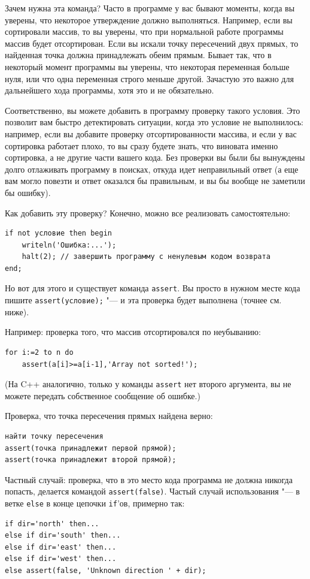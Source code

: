 \documentclass[a4paper,10pt]{problems}
\begin{document}
Зачем нужна эта команда? 
Часто в программе у вас бывают моменты, когда вы уверены, что некоторое утверждение должно выполняться.
Например, если вы сортировали массив, то вы уверены, что при нормальной работе программы массив будет отсортирован.
Если вы искали точку пересечений двух прямых, то найденная точка должна принадлежать обеим прямым. 
Бывает так, что в некоторый момент программы вы уверены, что некоторая переменная больше нуля, или
что одна переменная строго меньше другой. Зачастую это важно для дальнейшего хода программы, хотя это и не обязательно.

Соответственно, вы можете добавить в программу проверку такого условия. 
Это позволит вам быстро детектировать ситуации, когда это условие не выполнилось: например, если вы добавите проверку отсортированности массива,
и если у вас сортировка работает плохо, то вы сразу будете знать, что виновата именно сортировка, а не другие части вашего кода.
Без проверки вы были бы вынуждены долго отлаживать программу в поисках, откуда идет неправильный ответ (а еще вам могло повезти и ответ оказался бы правильным,
и вы бы вообще не заметили бы ошибку).

Как добавить эту проверку? Конечно, можно все реализовать самостоятельно:
\begin{verbatim}
if not условие then begin 
    writeln('Ошибка:...');
    halt(2); // завершить программу с ненулевым кодом возврата
end;
\end{verbatim}
Но вот для этого и существует команда \verb`assert`. 
Вы просто в нужном месте кода пишите \verb`assert(условие);` "--- и эта проверка будет выполнена (точнее см. ниже).

Например: проверка того, что массив отсортировался по неубыванию:
\begin{verbatim}
for i:=2 to n do
    assert(a[i]>=a[i-1],'Array not sorted!');
\end{verbatim}
(На C++ аналогично, только у команды \verb`assert` нет второго аргумента, вы не можете передать собственное сообщение об ошибке.)

Проверка, что точка пересечения прямых найдена верно:
\begin{verbatim}
найти точку пересечения
assert(точка принадлежит первой прямой);
assert(точка принадлежит второй прямой);
\end{verbatim}

Частный случай: проверка, что в это место кода программа не должна никогда попасть, делается командой \verb`assert(false)`. 
Частый случай использования "--- в ветке \verb`else` в конце цепочки \verb`if`'ов, примерно так:
\begin{verbatim}
if dir='north' then...
else if dir='south' then...
else if dir='east' then...
else if dir='west' then...
else assert(false, 'Unknown direction ' + dir);
\end{verbatim}
\end{document}
